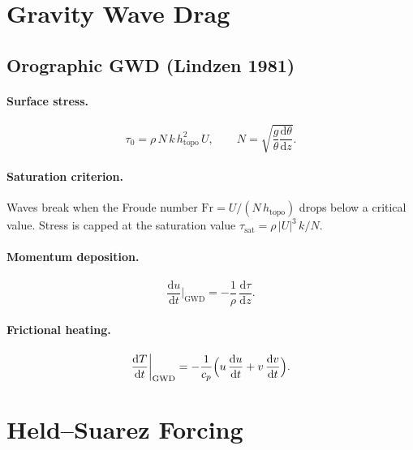 \documentclass[11pt,twoside]{report}
\newcommand{\dd}{\mathrm{d}}
\newcommand{\cpd}{c_p}
\begin{document}
\section{Gravity Wave Drag}
\label{sec:gwd}

\subsection{Orographic GWD (Lindzen 1981)}

\paragraph{Surface stress.}
\begin{equation}
  \tau_0 = \rho\,N\,k\,h_{\mathrm{topo}}^2\,U,
  \qquad N = \sqrt{\frac{g}{\theta}\frac{\dd\theta}{\dd z}}.
\end{equation}

\paragraph{Saturation criterion.}
Waves break when the Froude number $\mathrm{Fr}=U/(N\,h_{\mathrm{topo}})$
drops below a critical value.  Stress is capped at the saturation value
$\tau_{\mathrm{sat}}=\rho\,|U|^3\,k/N$.

\paragraph{Momentum deposition.}
\begin{equation}
  \frac{\dd u}{\dd t}\bigg|_{\mathrm{GWD}} = -\frac{1}{\rho}\,
  \frac{\dd\tau}{\dd z}.
\end{equation}

\paragraph{Frictional heating.}
\begin{equation}
  \frac{\dd T}{\dd t}\bigg|_{\mathrm{GWD}} =
  -\frac{1}{\cpd}\Bigl(u\,\frac{\dd u}{\dd t}+v\,\frac{\dd v}{\dd t}\Bigr).
\end{equation}


\section{Held--Suarez Forcing}
\label{sec:held-suarez}
\end{document}
